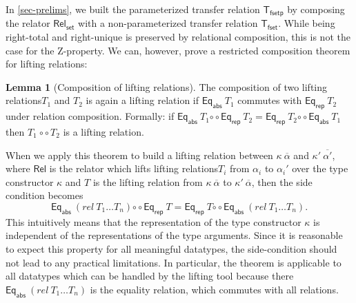 \documentclass{article}
\theoremstyle{definition}
\newtheorem{lemma}[definition]{Lemma}
\newcommand{\relcomp}{\mathbin{\circ\circ}}
\newcommand{\eqrep}{\mathsf{Eq_{rep}}}
\newcommand{\eqabs}{\mathsf{Eq_{abs}}}
\newcommand{\rel}{\mathsf{Rel}}
\newcommand{\liftrel}{lifting relation\xspace}
\newcommand{\liftrels}{lifting relations\xspace}
\begin{document}
In \cref{sec-prelims},
we built the parameterized transfer relation \(\mathsf{T_{fset p}}\) by composing the relator \(\mathsf{Rel_{set}}\) with a non-parameterized transfer relation \(\mathsf{T_{fset}}\).
While being right-total and right-unique is preserved by relational composition,
this is not the case for the Z-property.
We can, however, prove a restricted composition theorem for \liftrels:
\begin{lemma}[Composition of \liftrels]\label{comp-of-trans-rels}
	The composition of two \liftrels \(T_1\) and \(T_2\) is again a \liftrel if \(\eqabs\ T_1\) commutes with \( \eqrep\ T_2 \) under relation composition.
	Formally: if \(\eqabs\ T_1 \relcomp \eqrep\ T_2 = \eqrep\ T_2 \relcomp \eqabs\ T_1\) then \(T_1 \ \relcomp T_2\) is a \liftrel.
\end{lemma}

When we apply this theorem to build a \liftrel between
\(\kappa\ \overline{\alpha}\) and \(\kappa'\ \overline{\alpha'}\),
where \(\rel\) is the relator which lifts \liftrels \(T_i\) from \(\alpha_i\) to \(\alpha_i'\) over the type constructor \(\kappa\) and \(T\) is the \liftrel from \(\kappa\ \overline{\alpha}\) to \(\kappa'\ \overline{\alpha}\),
then the side condition becomes
\begin{equation*}
	\eqabs\ (rel\ T_1 \ldots T_n) \relcomp \eqrep\ T = \eqrep\ T \relcomp \eqabs\ (rel\ T_1 \ldots T_n).
\end{equation*}
This intuitively means that the representation of the type constructor
\(\kappa\) is independent of the representations of the type arguments.
Since it is reasonable to expect this property for all meaningful datatypes, the side-condition should not lead to any practical limitations. In particular, the theorem is applicable to all datatypes which can be handled by the lifting tool
because there \(\eqabs\ (rel\ T_1 \ldots T_n)\) is the equality relation,
which commutes with all relations.
\newline
\end{document}
